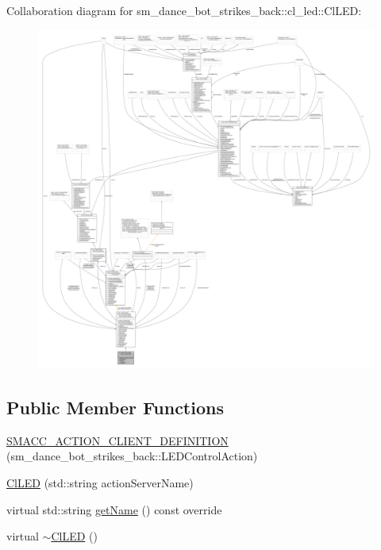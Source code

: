 Collaboration diagram for sm\+\_\+dance\+\_\+bot\+\_\+strikes\+\_\+back\+:\+:cl\+\_\+led\+:\+:Cl\+L\+ED\+:
\nopagebreak
\begin{figure}[H]
\begin{center}
\leavevmode
\includegraphics[width=350pt]{classsm__dance__bot__strikes__back_1_1cl__led_1_1ClLED__coll__graph}
\end{center}
\end{figure}
\subsection*{Public Member Functions}
\begin{DoxyCompactItemize}
\item 
\hyperlink{classsm__dance__bot__strikes__back_1_1cl__led_1_1ClLED_afe42a517e8b1b8e85f071f0fda0fb4d7}{S\+M\+A\+C\+C\+\_\+\+A\+C\+T\+I\+O\+N\+\_\+\+C\+L\+I\+E\+N\+T\+\_\+\+D\+E\+F\+I\+N\+I\+T\+I\+ON} (sm\+\_\+dance\+\_\+bot\+\_\+strikes\+\_\+back\+::\+L\+E\+D\+Control\+Action)
\item 
\hyperlink{classsm__dance__bot__strikes__back_1_1cl__led_1_1ClLED_a1ea09efd16caec88032896be43250692}{Cl\+L\+ED} (std\+::string action\+Server\+Name)
\item 
virtual std\+::string \hyperlink{classsm__dance__bot__strikes__back_1_1cl__led_1_1ClLED_aa774d43fe5a936b4bf292cb5447becd9}{get\+Name} () const override
\item 
virtual \hyperlink{classsm__dance__bot__strikes__back_1_1cl__led_1_1ClLED_a9365ecafd1b632f48c200b18afab0c7f}{$\sim$\+Cl\+L\+ED} ()
\end{DoxyCompactItemize}
